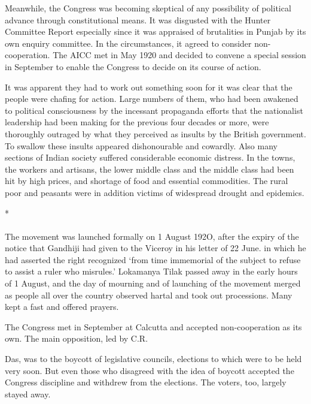 Meanwhile, the Congress was becoming skeptical of any possibility of political advance through constitutional means. It was disgusted with the Hunter Committee Report especially since it was appraised of brutalities in Punjab by its own enquiry committee. In the circumstances, it agreed to consider non-cooperation. The AICC met in May 1920 and decided to convene a special session in September to enable the Congress to decide on its course of action. 

It was apparent they had to work out something soon for it was clear that the people were chafing for action. Large numbers of them, who had been awakened to political consciousness by the incessant propaganda efforts that the nationalist leadership had been making for the previous four decades or more, were thoroughly outraged by what they perceived as insults by the British government. To swallow these insults appeared dishonourable and cowardly. Also many sections of Indian society suffered considerable economic distress. In the towns, the workers and artisans, the lower middle class and the middle class had been hit by high prices, and shortage of food and essential commodities. The rural poor and peasants were in addition victims of widespread drought and epidemics.

\begin{center}*\end{center}

\paragraph*{}


The movement was launched formally on 1 August 192O, after the expiry of the notice that Gandhiji had given to the Viceroy in his letter of 22 June. in which he had asserted the right recognized `from time immemorial of the subject to refuse to assist a ruler who misrules.' Lokamanya Tilak passed away in the early hours of 1 August, and the day of mourning and of launching of the movement merged as people all over the country observed hartal and took out processions. Many kept a fast and offered prayers. 

The Congress met in September at Calcutta and accepted non-cooperation as its own. The main opposition, led by C.R. 

Das, was to the boycott of legislative councils, elections to which were to be held very soon. But even those who disagreed with the idea of boycott accepted the Congress discipline and withdrew from the elections. The voters, too, largely stayed away. 

